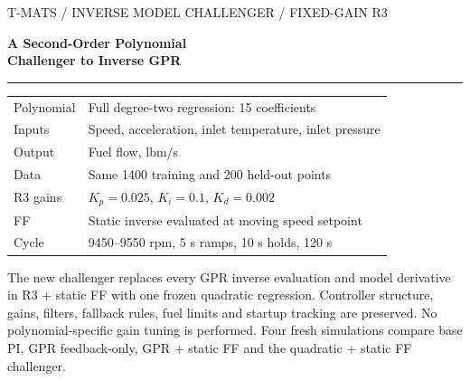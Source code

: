 \documentclass[11pt,a4paper]{article}
\begin{document}
\begin{titlepage}\color{navy}\sffamily
{\small T-MATS / INVERSE MODEL CHALLENGER / FIXED-GAIN R3}\par\vspace{22mm}
{\fontsize{30}{36}\selectfont\bfseries A Second-Order Polynomial\\Challenger to Inverse GPR\par}
\vspace{12mm}{\Large Same architecture, same data, same feedback gains\par}
\vspace{10mm}\color{teal}\rule{\linewidth}{1.2pt}\color{navy}\vspace{8mm}
\begin{tabular}{ll}
Polynomial & Full degree-two regression: 15 coefficients\\[5pt]
Inputs & Speed, acceleration, inlet temperature, inlet pressure\\[5pt]
Output & Fuel flow, lbm/s\\[5pt]
Data & Same 1400 training and 200 held-out points\\[5pt]
R3 gains & $K_p=0.025$, $K_i=0.1$, $K_d=0.002$\\[5pt]
FF & Static inverse evaluated at moving speed setpoint\\[5pt]
Cycle & 9450--9550 rpm, 5 s ramps, 10 s holds, 120 s
\end{tabular}
\par\vspace{12mm}\normalfont\color{ink}
The new challenger replaces every GPR inverse evaluation and model derivative in R3 + static FF with one frozen quadratic regression. Controller structure, gains, filters, fallback rules, fuel limits and startup tracking are preserved. No polynomial-specific gain tuning is performed.
\vfill Four fresh simulations compare base PI, GPR feedback-only, GPR + static FF and the quadratic + static FF challenger.
\end{titlepage}
\end{document}
